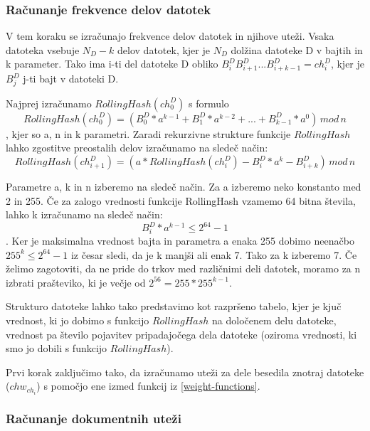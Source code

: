 \documentclass{acm_proc_article-sp}
\begin{document}
\subsubsection{Računanje frekvence delov datotek}

V tem koraku se izračunajo frekvence delov datotek in njihove uteži. Vsaka datoteka vsebuje $N_D - k$ delov datotek, kjer je $N_D$ dolžina datoteke D v bajtih in k parameter. Tako ima i-ti del datoteke D obliko $B_{i}^{D}B_{i+1}^{D}...B_{i+k-1}^{D} = ch_{i}^D$, kjer je $B_{j}^{D}$ j-ti bajt v datoteki D.

Najprej izračunamo $RollingHash(ch_{0}^D)$ s formulo \begin{displaymath} RollingHash(ch_{0}^D) = (B_{0}^{D}*a^{k-1} + B_{1}^{D}*a^{k-2} + ... + B_{k-1}^{D}*a^0)\, mod\, n \end{displaymath}, kjer so a, n in k parametri. Zaradi rekurzivne strukture funkcije $RollingHash$ lahko zgostitve preostalih delov izračunamo na sledeč način: \begin{displaymath} RollingHash(ch_{i+1}^D) = (a*RollingHash(ch_{i}^D)-B_{i}^{D}*a^{k}-B_{i+k}^D)\, mod\, n \end{displaymath}

Parametre a, k in n izberemo na sledeč način. Za a izberemo neko konstanto med 2 in 255. Če za zalogo vrednosti funkcije RollingHash vzamemo 64 bitna števila, lahko k izračunamo na sledeč način: \begin{displaymath}  B_{i}^{D}* a^{k-1} \leq 2^{64}-1\end{displaymath}. Ker je maksimalna vrednost bajta in parametra a enaka 255 dobimo neenačbo $255^k \leq 2^{64}-1$ iz česar sledi, da je k manjši ali enak 7. Tako za k izberemo 7. Če želimo zagotoviti, da ne pride do trkov med različnimi deli datotek, moramo za n izbrati prašteviko, ki je večje od $2^56=255*255^{k-1}$. 

Strukturo datoteke lahko tako predstavimo kot razpršeno tabelo, kjer je kjuč vrednost, ki jo dobimo s funkcijo $RollingHash$ na določenem delu datoteke, vrednost pa število pojavitev pripadajočega dela datoteke (oziroma vrednosti, ki smo jo dobili s funkcijo $RollingHash$).

Prvi korak zaključimo tako, da izračunamo uteži za dele besedila znotraj datoteke ($chw_{ch_i}$) s pomočjo ene izmed funkcij iz \ref{weight-functions}.

\subsubsection{Računanje dokumentnih uteži}
\end{document}
